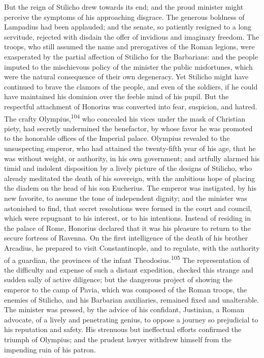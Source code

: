 
But the reign of Stilicho drew towards its end; and the proud
minister might perceive the symptoms of his approaching disgrace.
The generous boldness of Lampadius had been applauded; and the
senate, so patiently resigned to a long servitude, rejected with
disdain the offer of invidious and imaginary freedom. The troops,
who still assumed the name and prerogatives of the Roman legions,
were exasperated by the partial affection of Stilicho for the
Barbarians: and the people imputed to the mischievous policy of
the minister the public misfortunes, which were the natural
consequence of their own degeneracy. Yet Stilicho might have
continued to brave the clamors of the people, and even of the
soldiers, if he could have maintained his dominion over the
feeble mind of his pupil. But the respectful attachment of
Honorius was converted into fear, suspicion, and hatred. The
crafty Olympius,\textsuperscript{104} who concealed his vices under the mask of
Christian piety, had secretly undermined the benefactor, by whose
favor he was promoted to the honorable offices of the Imperial
palace. Olympius revealed to the unsuspecting emperor, who had
attained the twenty-fifth year of his age, that he was without
weight, or authority, in his own government; and artfully alarmed
his timid and indolent disposition by a lively picture of the
designs of Stilicho, who already meditated the death of his
sovereign, with the ambitious hope of placing the diadem on the
head of his son Eucherius. The emperor was instigated, by his new
favorite, to assume the tone of independent dignity; and the
minister was astonished to find, that secret resolutions were
formed in the court and council, which were repugnant to his
interest, or to his intentions. Instead of residing in the palace
of Rome, Honorius declared that it was his pleasure to return to
the secure fortress of Ravenna. On the first intelligence of the
death of his brother Arcadius, he prepared to visit
Constantinople, and to regulate, with the authority of a
guardian, the provinces of the infant Theodosius.\textsuperscript{105} The
representation of the difficulty and expense of such a distant
expedition, checked this strange and sudden sally of active
diligence; but the dangerous project of showing the emperor to
the camp of Pavia, which was composed of the Roman troops, the
enemies of Stilicho, and his Barbarian auxiliaries, remained
fixed and unalterable. The minister was pressed, by the advice of
his confidant, Justinian, a Roman advocate, of a lively and
penetrating genius, to oppose a journey so prejudicial to his
reputation and safety. His strenuous but ineffectual efforts
confirmed the triumph of Olympius; and the prudent lawyer
withdrew himself from the impending ruin of his patron.

